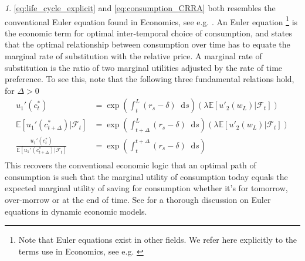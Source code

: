 \documentclass[11pt,oneside,english,reqno,dvipsnames,table]{amsart}
\numberwithin{equation}{section}
\theoremstyle{plain}
\theoremstyle{definition}
\theoremstyle{remark}
\newtheorem{rem}[thm]{\protect\remarkname}
\theoremstyle{plain}
\theoremstyle{plain}
\theoremstyle{plain}
\theoremstyle{plain}
\theoremstyle{plain}
\theoremstyle{plain}
\theoremstyle{plain}
\providecommand{\remarkname}{Remark}
\providecommand{\remarkname}{Remark}
\newcommand{\cF}{\mathcal{F}}
\newcommand{\EE}{\mathbb{E}}
\newcommand{\dd}{\mathop{}\!\mathrm{d}}
\numberwithin{thm}{section}
\begin{document}
\begin{rem}
\eqref{eq:life_cycle_explicit} and \eqref{eq:consumption_CRRA} both resembles the conventional Euler equation found in Economics, see e.g.  \cite{LjungqvistSargent2004}. 
An Euler equation \footnote{Note that Euler equations exist in other fields. We refer here explicitly to the terms use in Economics, see e.g. \cite{LjungqvistSargent2004}} is the economic term for optimal inter-temporal choice of consumption, and states that the optimal relationship between consumption over time has to equate the marginal rate of substitution with the relative price.
A marginal rate of substitution is the ratio of two marginal utilities adjusted by the rate of time preference.
To see this, note that the following three fundamental relations hold, for $\Delta >0$
%
\begin{align*}
    u_1'(c_t^*) &= \exp\left(\int_t^L (r_s-\delta)\dd s\right) \left(\lambda \EE\left[ u'_2(w_L)|\cF_t\right]\right)\\
    \EE[u_1'(c_{t+\Delta}^*) | \cF_t] &= \exp\left(\int_{t+\Delta}^L (r_s-\delta)\dd s\right) \left(\lambda \EE\left[ u'_2(w_L)|\cF_t\right]\right)\\
    \frac{u_1'(c_t^*)}{\EE[u_1'(c_{t+\Delta}^*) | \cF_t]} &= \exp\left(\int_{t}^{t+\Delta} (r_s-\delta)\dd s\right)\\
\end{align*}
%
This recovers the conventional economic logic that an optimal path of consumption is such that the marginal utility of consumption today equals the expected marginal utility of saving for consumption whether it's for tomorrow, over-morrow or at the end of time.
See \cite{acemoglu2009} for a thorough discussion on Euler equations in dynamic economic models.
\end{rem}

\end{document}
